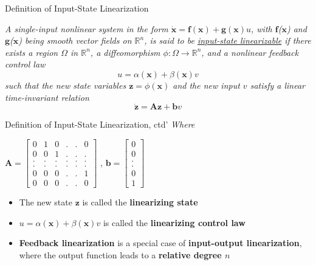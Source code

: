 \documentclass{beamer}
\renewcommand{\vec}[1]{\ensuremath{\boldsymbol{#1}}} %
\begin{document}
\begin{frame}{Definition of Input-State Linearization}
    \begin{definition}[6.6]
    \textit{
    A single-input nonlinear system in the form $ \dot{\vec{x}} = \vec{f}(\vec{x}) + \vec{g}(\vec{x})u $, with \vec{f}(\vec{x}) and \vec{g}(\vec{x}) being smooth vector fields on $\mathbb{R}^{n}$, is said to be \underline{input-state linearizable} if there exists a {\color{red}region $\Omega$ in $\mathbb{R}^{n}$}, a {\color{red}diffeomorphism $ \phi : \Omega \rightarrow \mathbb{R}^{n} $}, and a {\color{red}nonlinear feedback control law}
    \begin{equation}\label{affine}
      u = \alpha(\vec{x})+\beta(\vec{x})v
    \end{equation}
    such that the new state variables $\vec{z}=\phi(\vec{x})$ and the new input $v$ satisfy a linear time-invariant relation
    \begin{equation}\label{linear-relation}
      \dot{\vec{z}} = \vec{A}\vec{z}+\vec{b}v
    \end{equation}
    }
    \end{definition}
\end{frame}

\begin{frame}{Definition of Input-State Linearization, ctd'}
    \textit{Where}
    \begin{center}
    $\vec{A}=\left[\begin{matrix}
                    0 & 1 & 0 & . & . & 0 \\
                    0 & 0 & 1 & . & . & . \\
                    . & . & . & . & . & . \\
                    . & . & . & . & . & . \\
                    0 & 0 & 0 & . & . & 1 \\
                    0 & 0 & 0 & . & . & 0
                  \end{matrix}\right]$ , \quad
    $\vec{b}=\left[\begin{matrix}
                       0 \\
                       0 \\
                       . \\
                       . \\
                       0 \\
                       1
                     \end{matrix}\right]$
    \end{center}
    \begin{itemize}
      \item The new state \vec{z} is called the \textbf{linearizing state}
      \item $u = \alpha(\vec{x})+\beta(\vec{x})v$ is called the \textbf{linearizing control law}
      \item \textbf{Feedback linearization} is a {\color{red}special case} of \textbf{input-output linearization}, where the output function leads to a \textbf{relative degree $n$}
    \end{itemize}
\end{frame}
\end{document}
